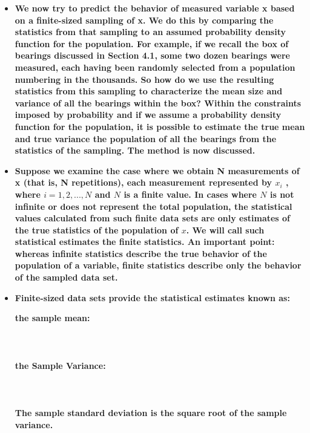 \documentclass[11pt]{article}
\newcommand{\B}{\color{blue}}
\newcommand{\PR}{\color{mypurple}}
\begin{document}
\begin{itemize}
\begin{itemize}
\item \textbf{ \Large We now try to predict the behavior of measured variable x based on a finite-sized sampling of x. We
do this by comparing the statistics from that sampling to an assumed probability density function for
the population. For example, if we recall the box of bearings discussed in Section 4.1, some two dozen bearings were measured, each having been randomly selected from a population numbering
in the thousands. So how do we use the resulting statistics from this sampling to characterize the
mean size and variance of all the bearings within the box? Within the constraints imposed by
probability and if we assume a probability density function for the population, it is possible to
estimate the true mean and true variance the population of all the bearings from the statistics of the
sampling. The method is now discussed. }\\

\item \textbf{ \Large  Suppose we examine the case where we obtain N measurements of x (that is, N repetitions),
each measurement represented by $x_i$ , where $i= 1, 2, . . . , N$ and $N$ is a finite value. In cases where
$N$ is not infinite or does not represent the total population, the statistical values calculated from such
finite data sets are only estimates of the true statistics of the population of $x$. We will call such
statistical estimates the finite statistics. An important point: whereas infinite statistics describe the
true behavior of the population of a variable, finite statistics describe only the behavior of the
sampled data set. }\\

\newpage
\item \textbf{ \Large Finite-sized data sets provide the statistical estimates known as: }

\begin{framed}
		\textbf{ \Large the {\bf \B sample mean:}}\\\\
		\\\\
		\textbf{ \Large the {\bf \B Sample Variance:}}\\\\
		\\\\
		\textbf{\Large The {\bf \PR sample standard deviation} is the square root of the {\bf \B sample variance}.}\\\\
		\vspace{0mm}\\
		\end{framed}



\end{itemize}
\end{itemize}
\end{document}
